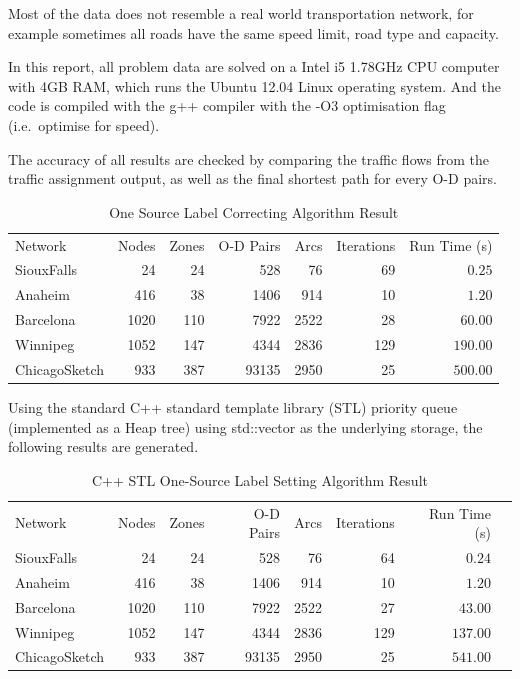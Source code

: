 Most of the data does not resemble a real world transportation network, 
for example sometimes all roads have the same speed limit, road type and capacity.

In this report, all problem data are solved on a Intel i5 1.78GHz CPU computer with 4GB RAM, which runs the Ubuntu 12.04 Linux operating system.
And the code is compiled with the g++ compiler with the -O3 optimisation flag (i.e.\ optimise for speed).

The accuracy of all results are checked by comparing the traffic flows from the traffic assignment output,
as well as the final shortest path for every O-D pairs.

\begin{table}
    \centering
    \begin{tabular}{lrrrrrr}
        Network & Nodes & Zones & O-D Pairs & Arcs  & Iterations  & Run Time (s) \\ 
        SiouxFalls    & 24   & 24  & 528   & 76      & 69         & $ 0.25 $     \\ 
        Anaheim       & 416  & 38  & 1406  & 914     & 10         & $ 1.20  $     \\
        Barcelona     & 1020 & 110 & 7922  & 2522    & 28         & $ 60.00   $     \\
        Winnipeg      & 1052 & 147 & 4344  & 2836    & 129        & $ 190.00  $     \\
        ChicagoSketch & 933  & 387 & 93135 & 2950    & 25         & $ 500.00  $    
    \end{tabular}
    \caption{One Source Label Correcting Algorithm Result}
\end{table}

Using the standard C++ standard template library (STL) priority queue (implemented as a Heap tree) using std::vector as the underlying storage,
the following results are generated.
\begin{table}
    \centering
    \begin{tabular}{lrrrrrrr}
        Network & Nodes & Zones & O-D Pairs & Arcs  & Iterations & Run Time (s) \\
        SiouxFalls    & 24   & 24  & 528   & 76     & 64         & $ 0.24 $     \\
        Anaheim       & 416  & 38  & 1406  & 914    & 10         & $ 1.20 $     \\
        Barcelona     & 1020 & 110 & 7922  & 2522   & 27         & $ 43.00 $    \\
        Winnipeg      & 1052 & 147 & 4344  & 2836   & 129        & $ 137.00 $   \\
        ChicagoSketch & 933  & 387 & 93135 & 2950   & 25         & $ 541.00 $  
    \end{tabular}
    \caption{C++ STL One-Source Label Setting Algorithm Result}
\end{table}


